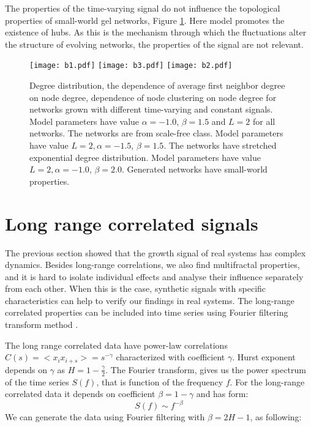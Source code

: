 The properties of the time-varying signal do not influence the topological properties of small-world gel networks, Figure \ref{fig:properties_net}. Here model promotes the existence of hubs. As this is the mechanism through which the fluctuations alter the structure of evolving networks, the properties of the signal are not relevant.   

\begin{figure}[H]
	\centering
	\texttt{[image: b1.pdf]}
	\texttt{[image: b3.pdf]}
	\texttt{[image: b2.pdf]}
	\caption{Degree distribution, the dependence of average first neighbor degree on node degree, dependence of node clustering on node degree for networks grown with different time-varying and constant signals. Model parameters have value $\alpha=-1.0$, $\beta=1.5$  and $L=2$ for all networks. The networks are from scale-free class. Model parameters have value $L=2, \alpha=-1.5$, $\beta=1.5$. The networks have stretched exponential degree distribution. Model parameters have value $ L=2, \alpha=-1.0$, $\beta=2.0$. Generated networks have small-world properties.}
	\label{fig:properties_net}
\end{figure}

\section{Long range correlated signals}

The previous section showed that the growth signal of real systems has complex dynamics. Besides long-range correlations, we also find multifractal properties, and it is hard to isolate individual effects and analyse their influence separately from each other. When this is the case, synthetic signals with specific characteristics can help to verify our findings in real systems. The long-range correlated properties can be included into time series using Fourier filtering transform method \cite{makse1996method}. 

The long range correlated data have power-law correlations $C(s)= <x_i x_{i+s}> = s ^ {-\gamma}$ characterized with coefficient $\gamma$. Hurst exponent depends on $\gamma$ as  $H = 1- \frac{\gamma}{2}$. The Fourier transform, gives us the power spectrum of the time series $S(f)$, that is function of the frequency $f$. For the long-range correlated data it depends on coefficient $\beta = 1-\gamma$ and has form:
\begin{equation}
S(f) \sim f^{-\beta}
\end{equation}
We can generate the data using Fourier filtering with $\beta = 2H - 1$, as following:


